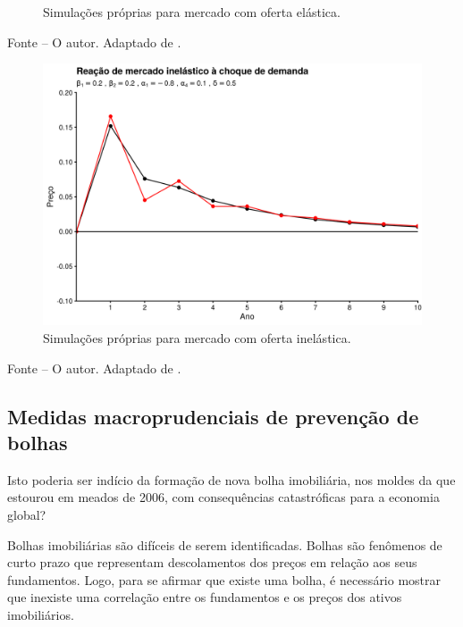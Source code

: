 \documentclass[
	12pt,				%
	oneside,			%
	a4paper,			%
	chapter=TITLE,		%
	section=TITLE,		%
	english,			%
	brazil				%
	]{abntex2}
\newcommand{\bcenter}{\begin{center}}
\newcommand{\ecenter}{\end{center}}
\begin{document}
\begin{refsection}
\begin{figure}[H]
{}

\caption{Simulações próprias para mercado com oferta elástica.}\label{fig:elastico}
\end{figure}
\bcenter

\small Fonte -- O autor. Adaptado de \textcite{Malpezzi2002TheRO}.
\ecenter
\begin{figure}[H]

{\centering \includegraphics[width=0.7\linewidth]{images/inelastico-1} 

}

\caption{Simulações próprias para mercado com oferta inelástica.}\label{fig:inelastico}
\end{figure}
\bcenter

\small Fonte -- O autor. Adaptado de \textcite{Malpezzi2002TheRO}.
\ecenter

\hypertarget{medidas-macroprudenciais-de-prevenuxe7uxe3o-de-bolhas}{%
\subsection{Medidas macroprudenciais de prevenção de bolhas}\label{medidas-macroprudenciais-de-prevenuxe7uxe3o-de-bolhas}}

Isto poderia ser indício da formação de nova bolha imobiliária, nos moldes da
que estourou em meados de 2006, com consequências catastróficas para a economia
global?

Bolhas imobiliárias são difíceis de serem identificadas. Bolhas são fenômenos
de curto prazo que representam descolamentos dos preços em relação aos seus
fundamentos. Logo, para se afirmar que existe uma bolha, é necessário mostrar
que inexiste uma correlação entre os fundamentos e os preços dos ativos
imobiliários.


\end{refsection}
\end{document}
